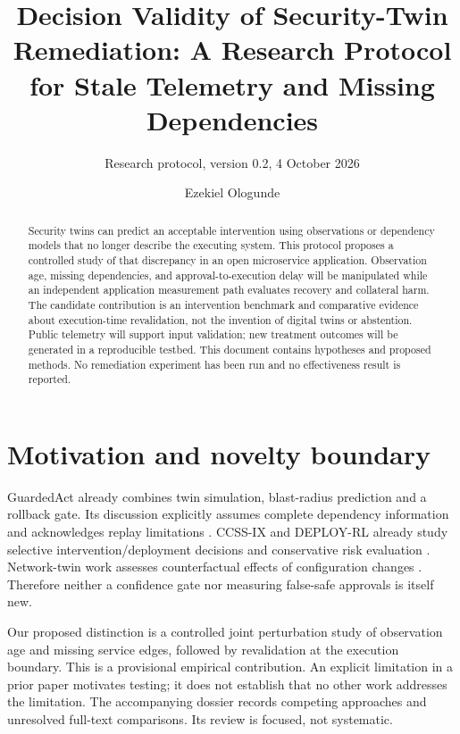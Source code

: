 ﻿\documentclass[sigconf,nonacm]{acmart}
\title{Decision Validity of Security-Twin Remediation: A Research Protocol for Stale Telemetry and Missing Dependencies}
\subtitle{Research protocol, version 0.2, 4 October 2026}
\author{Ezekiel Ologunde}
\affiliation{%
  \institution{Independent Researcher}
  \city{Boston}
  \state{MA}
  \country{USA}}
\begin{document}
\begin{abstract}
Security twins can predict an acceptable intervention using observations or dependency models that no longer describe the executing system. This protocol proposes a controlled study of that discrepancy in an open microservice application. Observation age, missing dependencies, and approval-to-execution delay will be manipulated while an independent application measurement path evaluates recovery and collateral harm. The candidate contribution is an intervention benchmark and comparative evidence about execution-time revalidation, not the invention of digital twins or abstention. Public telemetry will support input validation; new treatment outcomes will be generated in a reproducible testbed. This document contains hypotheses and proposed methods. No remediation experiment has been run and no effectiveness result is reported.
\end{abstract}
\maketitle

\section{Motivation and novelty boundary}
GuardedAct already combines twin simulation, blast-radius prediction and a rollback gate. Its discussion explicitly assumes complete dependency information and acknowledges replay limitations \cite{guarded}. CCSS-IX and DEPLOY-RL already study selective intervention/deployment decisions and conservative risk evaluation \cite{ccss,deploy}. Network-twin work assesses counterfactual effects of configuration changes \cite{sixg}. Therefore neither a confidence gate nor measuring false-safe approvals is itself new.

Our proposed distinction is a controlled joint perturbation study of observation age and missing service edges, followed by revalidation at the execution boundary. This is a provisional empirical contribution. An explicit limitation in a prior paper motivates testing; it does not establish that no other work addresses the limitation. The accompanying dossier records competing approaches and unresolved full-text comparisons. Its review is focused, not systematic.
\end{document}
